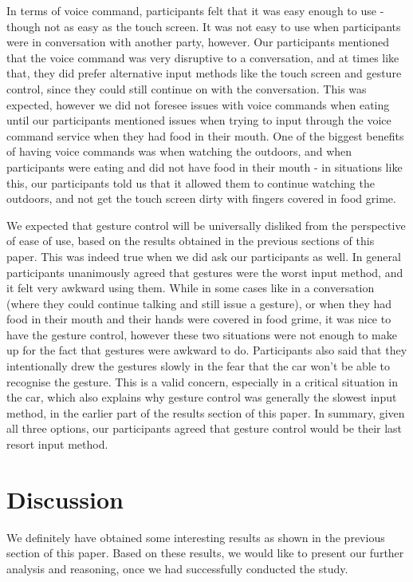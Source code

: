 \documentclass{sigchi}
\begin{document}
In terms of voice command, participants felt that it was easy enough to use - though not as easy as the touch screen. It was not easy to use when participants were in conversation with another party, however. Our participants mentioned that the voice command was very disruptive to a conversation, and at times like that, they did prefer alternative input methods like the touch screen and gesture control, since they could still continue on with the conversation. This was expected, however we did not foresee issues with voice commands when eating until our participants mentioned issues when trying to input through the voice command service when they had food in their mouth. One of the biggest benefits of having voice commands was when watching the outdoors, and when participants were eating and did not have food in their mouth - in situations like this, our participants told us that it allowed them to continue watching the outdoors, and not get the touch screen dirty with fingers covered in food grime.

We expected that gesture control will be universally disliked from the perspective of ease of use, based on the results obtained in the previous sections of this paper. This was indeed true when we did ask our participants as well. In general participants unanimously agreed that gestures were the worst input method, and it felt very awkward using them. While in some cases like in a conversation (where they could continue talking and still issue a gesture), or when they had food in their mouth and their hands were covered in food grime, it was nice to have the gesture control, however these two situations were not enough to make up for the fact that gestures were awkward to do. Participants also said that they intentionally drew the gestures slowly in the fear that the car won't be able to recognise the gesture. This is a valid concern, especially in a critical situation in the car, which also explains why gesture control was generally the slowest input method, in the earlier part of the results section of this paper. In summary, given all three options, our participants agreed that gesture control would be their last resort input method.

\section{Discussion}

We definitely have obtained some interesting results as shown in the previous section of this paper. Based on these results, we would like to present our further analysis and reasoning, once we had successfully conducted the study.
\end{document}
